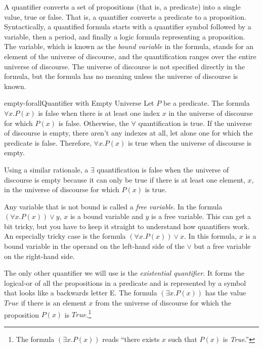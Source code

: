 {{A
\label{def:quantifier}
quantifier converts a set of propositions (that is, a predicate)
into a single value, true or false. That is, a quantifier converts
a predicate to a proposition.
Syntactically, a quantified formula starts with a quantifier symbol followed by
a variable, then a period, and finally a logic formula
representing a proposition. The variable,
which is known as the
\label{def:bound-variable}
\emph{bound variable}
in the formula, stands for an
element of the universe of discourse, and the quantification
ranges over the entire universe of discourse.
The universe of discourse is not specified directly
in the formula, but the formula has no meaning unless
the universe of discourse is known.

\begin{aside}{empty-forall}{Quantifier with Empty Universe}
Let $P$ be a predicate.
The formula
$\forall x.P(x)$
is false when there is
at least one index $x$ in the universe of discourse
for which $P(x)$ is false.
Otherwise, the $\forall$ quantification is true.
If the universe of discourse is empty,
there aren't any indexes at all,
let alone one for which the predicate is false.
Therefore, $\forall x.P(x)$ is true
when the universe of discourse is empty.

Using a similar rationale, a
$\exists$ quantification
is false when the universe of discourse is empty
because it can only be true if there is
at least one element, $x$, in the universe of discourse
for which $P(x)$ is true.
\end{aside}

Any variable that is not bound is
called a
\label{def:free-variable}\emph{free variable}.
In the formula $(\forall x.P(x)) \vee y$,
$x$ is a bound variable and $y$ is a free variable.
This can get a bit tricky, but you have to keep it
straight to understand how quantifiers work.
An especially tricky case is the formula
$(\forall x.P(x)) \vee x$.
In this formula, $x$ is a bound variable in the
operand on the left-hand side of the $\vee$
but a free variable on the right-hand side.

The only other quantifier we will use is the
\label{def:existential-quantifier}\emph{existential quantifier}.
It forms the logical-or of all the propositions in a predicate
and is represented by a symbol that looks like a backwards letter E.
The  formula $(\exists x.P(x))$
has the value $True$
if there is an element $x$ from the universe of discourse
for which the proposition $P(x)$ is $True$.\footnote{The
formula $(\exists x.P(x))$ reads
``there exists $x$ such that $P(x)$ is \emph{True}.''}

}}
